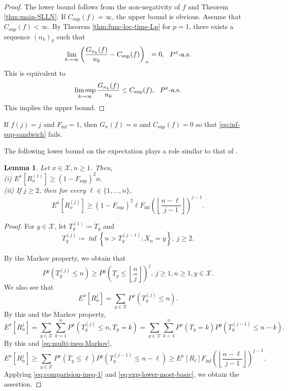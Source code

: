 \documentclass[a4paper, reqno, 11pt]{amsart}
\newtheorem{Lem}[Thm]{Lemma}
\theoremstyle{definition}
\begin{document}
\begin{proof}
The lower bound follows from the non-negativity of $f$ and Theorem \ref{thm:main-SLLN}. 
If $C_{\sup}(f) = \infty$, the upper bound is obvious. 
Assume that $C_{\sup}(f) < \infty$. 
By Theorem \ref{thm:func-loc-time-Lp} for $p=1$, 
there exists a sequence $(n_k)_k$ such that 
\[ \lim_{k \to \infty}  \left( \frac{G_{n_k} (f)}{n_k} - C_{\sup}(f) \right)_{+} = 0, \ \textup{ $P^x$-a.s.}  \]
This is equivalent to  
\[ \limsup_{k \to \infty}  \frac{G_{n_k} (f)}{n_k} \le C_{\sup}(f), \ \textup{ $P^x$-a.s.} \]
This implies the upper bound. 
\end{proof}

If $f(j) = j$ and $F_{\inf} = 1$, then $G_n (f) = n$ and $C_{\sup}(f) = 0$ so that \eqref{eq:inf-sup-sandwich} fails. 


The following lower bound on the expectation plays a role similar to that of  \cite[Lemma 3]{CCMP2026}. 

\begin{Lem}\label{lem:exp-lower-quantitative}
Let $x \in \mathcal{X}, n \ge 1$. 
Then, \\
(i) $E^x \left[ R_n^{(1)} \right] \ge (1-F_{\sup})^2 n$.\\
(ii) If $j \ge 2$, then for every  $\ell \in \{1,\dots, n\}$, 
\[ E^x \left[ R_n^{(j)} \right] \ge (1-F_{\sup})^2 \ell F_{\inf}\left( \left\lfloor \frac{n-\ell}{j-1} \right\rfloor\right)^{j-1}. \]
\end{Lem}

\begin{proof}
For $y \in \mathcal{X}$, 
let $ T_y^{(1)} \coloneqq T_y$ and 
\[ T_y^{(j)} \coloneqq \inf \left\{n > T_y^{(j-1)} \colon X_n = y \right\}, \ j \ge 2. \]

By the Markov property, we obtain that 
\begin{equation}\label{eq:multi-ineq-Markov}
P^y \left( T_y^{(j)} \le n \right) \ge P^y \left( T_y \le \left\lfloor \frac{n}{j} \right\rfloor \right)^{j}, \ j \ge 1, n \ge 1, y \in \mathcal{X}. 
\end{equation}
We also see that 
\begin{equation*}
E^x \left[ R_n^j \right] = \sum_{y \in \mathcal{X}}  P^x \left( T_y^{(j)} \le n \right). 
\end{equation*}
By this and the Markov property, 
\[ E^x \left[ R_n^j \right] = \sum_{y \in \mathcal{X}}  \sum_{k = 1}^{n}  P^x \left( T_y^{(j)} \le n, T_y = k \right) = \sum_{y \in \mathcal{X}}  \sum_{k = 1}^{n}  P^x \left( T_y = k \right) P^y \left( T_y^{(j-1)} \le n - k \right). \]
By this and \eqref{eq:multi-ineq-Markov}, 
\[  E^x \left[ R_n^j \right] \ge \sum_{y \in \mathcal{X}} P^x \left( T_y \le \ell \right) P^y \left( T_y^{(j-1)} \le n - \ell \right) \ge E^x \left[R_{\ell}\right] F_{\inf}\left( \left\lfloor \frac{n-\ell}{j-1} \right\rfloor\right)^{j-1}. \]
Applying \eqref{eq:comparision-ineq-1} and  \eqref{eq:exp-lower-most-basic}, we obtain the assertion. 
\end{proof}
\end{document}
